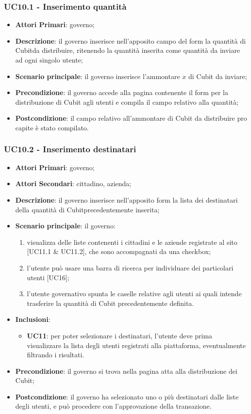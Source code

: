 \subsubsection{UC10.1 - Inserimento quantità}
\begin{itemize}
	\item \textbf{Attori Primari}: governo;
	\item \textbf{Descrizione}: il governo inserisce nell'apposito campo del form la quantità di Cubit\glosp da distribuire, ritenendo la quantità inserita come quantità da inviare ad ogni singolo utente;
	\item \textbf{Scenario principale}: il governo inserisce l'ammontare $x$ di 
	Cubit da inviare;
	\item \textbf{Precondizione}: il governo accede alla pagina contenente il form per la distribuzione di Cubit agli utenti e compila il campo relativo alla quantità;
	\item \textbf{Postcondizione}: il campo relativo all'ammontare di Cubit da 
	distribuire pro capite è stato compilato. 
\end{itemize}
\subsubsection{UC10.2 - Inserimento destinatari}
\begin{itemize}
	\item \textbf{Attori Primari}: governo;
	\item \textbf{Attori Secondari}: cittadino, azienda;
	\item \textbf{Descrizione}: il governo inserisce nell'apposito form la lista dei destinatari della quantità di Cubit\glosp precedentemente inserita;
	\item \textbf{Scenario principale}: il governo:
	\begin{enumerate}[label=\alph*.]
		\item visualizza delle liste contenenti i cittadini e le aziende registrate al sito [UC11.1 \& UC11.2], che sono accompagnati da una checkbox;
		\item l'utente può usare una barra di ricerca per individuare dei particolari utenti [UC16];
		\item l'utente governativo spunta le caselle relative agli utenti ai quali intende trasferire la quantità di Cubit precedentemente definita.
	\end{enumerate}
	\item \textbf{Inclusioni}:
	\begin{itemize}
		\item \textbf{UC11}: per poter selezionare i destinatari, l'utente deve prima visualizzare la lista degli utenti registrati alla piattaforma, eventualmente filtrando i risultati.
	\end{itemize}
	\item \textbf{Precondizione}: il governo si trova nella pagina atta alla distribuzione dei Cubit;
	\item \textbf{Postcondizione}: il governo ha selezionato uno o più destinatari dalle liste degli utenti, e può procedere con l'approvazione della transazione.
\end{itemize}
